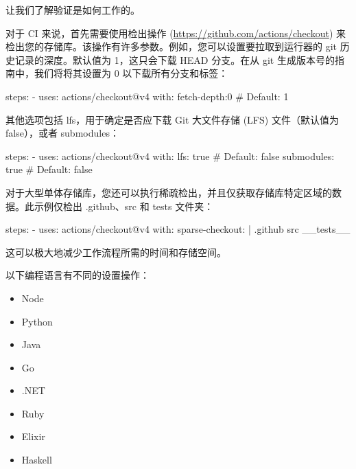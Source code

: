 
让我们了解验证是如何工作的。


对于 CI 来说，首先需要使用检出操作 (\url{https://github.com/actions/checkout}) 来检出您的存储库。该操作有许多参数。例如，您可以设置要拉取到运行器的 git 历史记录的深度。默认值为 1，这只会下载 HEAD 分支。在从 git 生成版本号的指南中，我们将将其设置为 0 以下载所有分支和标签：

\begin{shell}
steps:
  - uses: actions/checkout@v4
    with:
      fetch-depth:0 # Default: 1
\end{shell}

其他选项包括 lfs，用于确定是否应下载 Git 大文件存储 (LFS) 文件（默认值为 false），或者 submodules：

\begin{shell}
steps:
  - uses: actions/checkout@v4
    with:
      lfs: true # Default: false
      submodules: true # Default: false
\end{shell}
  
对于大型单体存储库，您还可以执行稀疏检出，并且仅获取存储库特定区域的数据。此示例仅检出 .github、src 和 tests 文件夹：

\begin{shell}
steps:
  - uses: actions/checkout@v4
    with:
      sparse-checkout: |
        .github
        src
        __tests__
\end{shell}

这可以极大地减少工作流程所需的时间和存储空间。


以下编程语言有不同的设置操作：

\begin{itemize}
\item 
Node

\item
Python

\item
Java

\item
Go

\item
.NET

\item
Ruby

\item
Elixir

\item
Haskell
\end{itemize}


